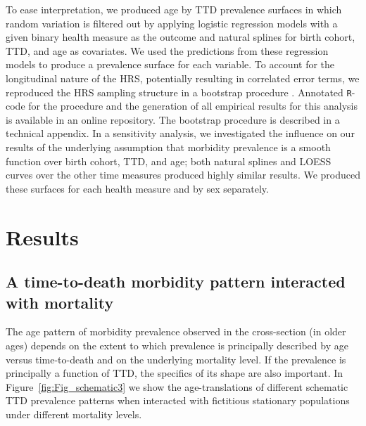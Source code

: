 \documentclass[11pt,oneside,a4paper]{article} %
\begin{document}
To ease interpretation, we produced age by TTD prevalence surfaces in which
random variation is filtered out by applying logistic regression models with a
given binary health measure as the outcome and natural splines for birth cohort,
TTD, and age as covariates. We used the predictions from these regression models
to produce a prevalence surface for each variable. To account for the
longitudinal nature of the HRS, potentially resulting in correlated error terms,
we reproduced the HRS sampling structure in a bootstrap procedure
\citep{efron1994introduction}. Annotated \texttt{R}-code for the procedure and the generation of all empirical results for this analysis is available in an online repository. The bootstrap procedure is described in a technical appendix. In a sensitivity analysis, we investigated the influence on our results of the underlying assumption that morbidity prevalence is a smooth function over birth cohort, TTD, and age; both natural splines and LOESS curves over the other time measures \citep{riffe2015ttd} produced highly similar results. We produced these surfaces for each health measure and by sex separately.
% 







\section{Results}
\label{sec:ttdok}

\FloatBarrier
\subsection{A time-to-death morbidity pattern interacted with mortality}
\label{sec:schematic}
The age pattern of morbidity prevalence observed in the cross-section (in older ages) depends
on the extent to which prevalence is principally described by
age versus time-to-death and on the underlying mortality
level. If the prevalence is principally a function of TTD, the
specifics of its shape are also important. In Figure~\ref{fig:Fig_schematic3} we
show the age-translations of different schematic TTD prevalence patterns when
interacted with fictitious stationary populations under different mortality levels.
\end{document}
